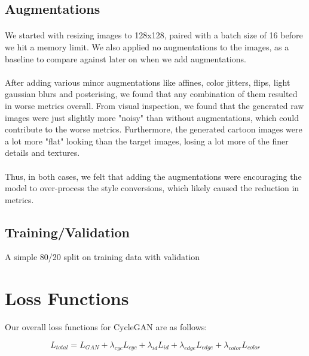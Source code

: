\documentclass[twoside,english,notitlepage]{report}
\begin{document}
\subsection{Augmentations}
\paragraph{} We started with resizing images to 128x128, paired with a batch size of 16 before we hit a memory limit. We also applied no augmentations to the images, as a baseline to compare against later on when we add augmentations.

\paragraph{} After adding various minor augmentations like affines, color jitters, flips, light gaussian blurs and posterising, we found that any combination of them resulted in worse metrics overall. From visual inspection, we found that the generated raw images were just slightly more "noisy" than without augmentations, which could contribute to the worse metrics. Furthermore, the generated cartoon images were a lot more "flat" looking than the target images, losing a lot more of the finer details and textures. 

\paragraph{} Thus, in both cases, we felt that adding the augmentations were encouraging the model to over-process the style conversions, which likely caused the reduction in metrics. 

\subsection{Training/Validation}
A simple 80/20 split on training data with validation



\section{Loss Functions}
Our overall loss functions for CycleGAN are as follows:


\begin{equation}
    L_{total} = L_{GAN} + \lambda_{cyc} L_{cyc} + \lambda_{id} L_{id} + \lambda_{edge} L_{edge} + \lambda_{color} L_{color}
\end{equation}
\end{document}
